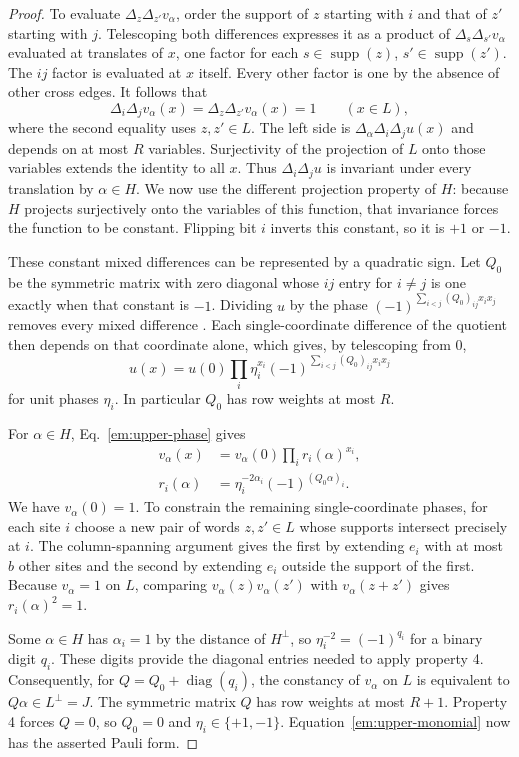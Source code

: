 \documentclass[aps,prl,reprint,longbibliography,nofootinbib,nobibnotes]{revtex4-2}
\newif\ifshowchanges
\DeclareRobustCommand{\rev}[1]{\leavevmode{\ifshowchanges\color{RevisionPurple}%
  \hypersetup{allcolors=RevisionPurple}\fi #1%
  \ifhmode\xdef\revspacefactor{\the\spacefactor}%
    \aftergroup\revrestorespacefactor\fi}}
\newcommand{\revrestorespacefactor}{\ifhmode\spacefactor\revspacefactor\relax\fi}
\begin{document}
\begin{proof}
To evaluate $\Delta_z\Delta_{z'}v_\alpha$, order the support of $z$ starting with $i$ and that of
$z'$ starting with $j$. Telescoping both differences expresses it as a product of
$\Delta_s\Delta_{s'}v_\alpha$ evaluated at translates of $x$, one factor for each
$s\in\operatorname{supp}(z)$, $s'\in\operatorname{supp}(z')$. The $ij$ factor is evaluated at $x$
itself. Every other factor is one by the absence of other cross edges. It follows that
\[
 \Delta_i\Delta_j v_\alpha(x)=\Delta_z\Delta_{z'}v_\alpha(x)=1
 \qquad (x\in L),
\]
where the second equality uses $z,z'\in L$. The left side is $\Delta_\alpha\Delta_i\Delta_j u(x)$
and depends on at most $R$ variables. Surjectivity of the projection of $L$ onto those variables
extends the identity to all $x$. Thus $\Delta_i\Delta_j u$ is invariant under every translation by
$\alpha\in H$. We now use the different projection property of $H$: because $H$ projects
surjectively onto the variables of this function, that invariance forces the function to be
constant. Flipping bit $i$ inverts this constant, so it is $+1$ or $-1$.

These constant mixed differences can be represented by a quadratic sign. Let $Q_0$ be the symmetric
matrix with zero diagonal whose $ij$ entry for $i\ne j$ is one exactly when that constant is $-1$.
Dividing $u$ by the phase $(-1)^{\sum_{i<j}(Q_0)_{ij}x_i x_j}$ removes every mixed difference \rev{with distinct indices}. Each
single-coordinate difference of the quotient then depends on that coordinate alone, which gives, by
telescoping from $0$,
\begin{equation}\label{em:upper-phase}
 u(x)=u(0)\prod_i\eta_i^{x_i}
          (-1)^{\sum_{i<j}(Q_0)_{ij}x_i x_j}
\end{equation}
for unit phases $\eta_i$. In particular $Q_0$ has row weights at most $R$.

For $\alpha\in H$, Eq.~\eqref{em:upper-phase} gives
\[
 \begin{aligned}
 v_\alpha(x)&=v_\alpha(0)\prod_i r_i(\alpha)^{x_i},\\
 r_i(\alpha)&=\eta_i^{-2\alpha_i}(-1)^{(Q_0\alpha)_i}.
 \end{aligned}
\]
We have $v_\alpha(0)=1$. To constrain the remaining single-coordinate phases, for each site $i$
choose a new pair of words $z,z'\in L$ whose supports intersect precisely at $i$. The
column-spanning argument gives the first by extending $e_i$ with at most $b$ other sites and the
second by extending $e_i$ outside the support of the first. Because $v_\alpha=1$ on $L$, comparing
$v_\alpha(z)v_\alpha(z')$ with $v_\alpha(z+z')$ gives $r_i(\alpha)^2=1$.

Some $\alpha\in H$ has $\alpha_i=1$ by the distance of $H^\perp$, so $\eta_i^{-2}=(-1)^{q_i}$ for a
binary digit $q_i$. These digits provide the diagonal entries needed to apply property 4.
Consequently, for $Q=Q_0+\operatorname{diag}(q_i)$, the constancy of $v_\alpha$ on $L$ is
equivalent to $Q\alpha\in L^\perp=J$. The symmetric matrix $Q$ has row weights at most $R+1$.
Property 4 forces $Q=0$, so $Q_0=0$ and $\eta_i\in\{+1,-1\}$. Equation~\eqref{em:upper-monomial}
now has the asserted Pauli form.
\end{proof}
\end{document}
